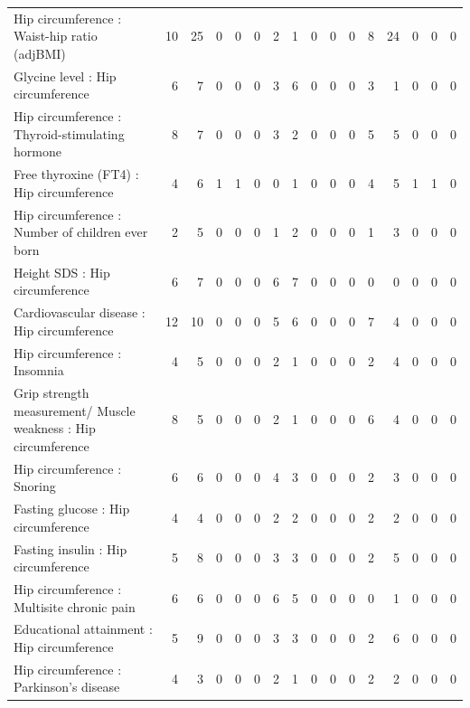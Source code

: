 \begin{table}[ht]
\begin{tabular}{lrrrrrrrrrrrrrrr}
  Hip circumference  : Waist-hip ratio (adjBMI) &  10 &  25 &   0 &   0 &   0 &   2 &   1 &   0 &   0 &   0 &   8 &  24 &   0 &   0 &   0 \\ 
  Glycine level  : Hip circumference  &   6 &   7 &   0 &   0 &   0 &   3 &   6 &   0 &   0 &   0 &   3 &   1 &   0 &   0 &   0 \\ 
  Hip circumference  : Thyroid-stimulating hormone  &   8 &   7 &   0 &   0 &   0 &   3 &   2 &   0 &   0 &   0 &   5 &   5 &   0 &   0 &   0 \\ 
  Free thyroxine (FT4) : Hip circumference  &   4 &   6 &   1 &   1 &   0 &   0 &   1 &   0 &   0 &   0 &   4 &   5 &   1 &   1 &   0 \\ 
  Hip circumference  : Number of children ever born  &   2 &   5 &   0 &   0 &   0 &   1 &   2 &   0 &   0 &   0 &   1 &   3 &   0 &   0 &   0 \\ 
  Height SDS : Hip circumference  &   6 &   7 &   0 &   0 &   0 &   6 &   7 &   0 &   0 &   0 &   0 &   0 &   0 &   0 &   0 \\ 
  Cardiovascular disease : Hip circumference  &  12 &  10 &   0 &   0 &   0 &   5 &   6 &   0 &   0 &   0 &   7 &   4 &   0 &   0 &   0 \\ 
  Hip circumference  : Insomnia &   4 &   5 &   0 &   0 &   0 &   2 &   1 &   0 &   0 &   0 &   2 &   4 &   0 &   0 &   0 \\ 
  Grip strength measurement/ Muscle weakness : Hip circumference  &   8 &   5 &   0 &   0 &   0 &   2 &   1 &   0 &   0 &   0 &   6 &   4 &   0 &   0 &   0 \\ 
  Hip circumference  : Snoring &   6 &   6 &   0 &   0 &   0 &   4 &   3 &   0 &   0 &   0 &   2 &   3 &   0 &   0 &   0 \\ 
  Fasting glucose : Hip circumference  &   4 &   4 &   0 &   0 &   0 &   2 &   2 &   0 &   0 &   0 &   2 &   2 &   0 &   0 &   0 \\ 
  Fasting insulin : Hip circumference  &   5 &   8 &   0 &   0 &   0 &   3 &   3 &   0 &   0 &   0 &   2 &   5 &   0 &   0 &   0 \\ 
  Hip circumference  : Multisite chronic pain &   6 &   6 &   0 &   0 &   0 &   6 &   5 &   0 &   0 &   0 &   0 &   1 &   0 &   0 &   0 \\ 
  Educational attainment : Hip circumference  &   5 &   9 &   0 &   0 &   0 &   3 &   3 &   0 &   0 &   0 &   2 &   6 &   0 &   0 &   0 \\ 
  Hip circumference  : Parkinson's disease &   4 &   3 &   0 &   0 &   0 &   2 &   1 &   0 &   0 &   0 &   2 &   2 &   0 &   0 &   0 \\ 

\end{tabular}
\end{table}
